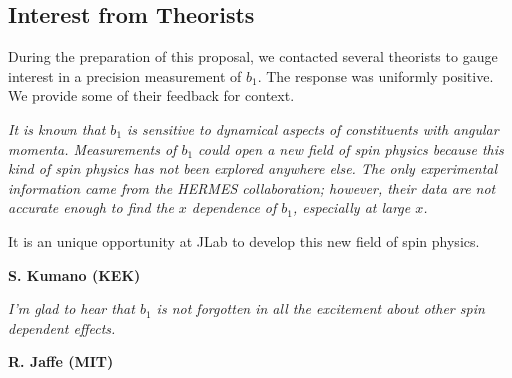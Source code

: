 \newpage
\subsection{Interest from Theorists}
%
During the preparation of this proposal, we contacted several theorists 
to gauge interest in a precision measurement of $b_1$.  The response was uniformly positive.  We 
provide some of their feedback for context.
%
%

\vspace{0.5cm}
\noindent
{\it 
It is known that $b_1$ is sensitive to dynamical aspects
of constituents with angular momenta. 
%
Measurements of $b_1$ could open
a new field of spin physics because this kind of spin physics has not
been explored anywhere else. The only experimental information came from
the HERMES collaboration; however, their data are not accurate enough
to find the $x$ dependence of $b_1$, especially at large $x$. 

It is an unique opportunity at JLab to develop this new field of spin physics.

}
\begin{flushright}{\bf S. Kumano (KEK)}\end{flushright}

\vspace{0.5cm}
\noindent
{\it I'm glad to hear that $b_1$ is not forgotten in all the excitement about other spin dependent 
effects.
}
\begin{flushright}{\bf R. Jaffe (MIT)}\end{flushright}

